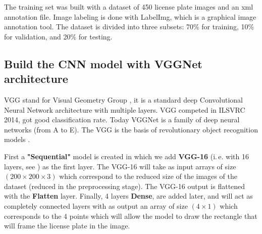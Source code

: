 \documentclass[lnbip]{svmultln}
\newcommand{\myfloatalign}{\centering}
\newcommand{\ie}{i.\,e. }
\begin{document}
	The training set was built with a dataset of 450 license plate images and an xml annotation file. Image labeling is done with LabelImg, which is a graphical image annotation tool. The dataset is divided into three subsets: 70\% for training, 10\% for validation, and 20\% for testing.
	


\subsection{Build the CNN model with VGGNet architecture}

	
	VGG stand for Visual Geometry Group \cite[][chap. 10]{antoine2018apprentissage}, it is a standard deep Convolutional Neural Network architecture with multiple layers. VGG competed in ILSVRC 2014, got good classification rate. Today VGGNet is a family of deep neural networks (from A to E). The VGG is the basis of revolutionary object recognition models \cite[]{tammina2019transfer}.  
	
 	First a \textbf{"Sequential"} model is created in which we add \textbf{VGG-16} (\ie with 16 layers, see \cite[]{antoine2018apprentissage, geron2017hands}) as the first layer. The VGG-16 will take as input arrays of size $(200 \times 200 \times 3)$ which correspond to the reduced size of the images of the dataset (reduced in the preprocessing stage).
 	The VGG-16 output is flattened with the \textbf{Flatten} layer. Finally, 4 layers \textbf{Dense}, are added later, and will act as completely connected layers with as output an array of size $(4 \times 1)$ which corresponds to the 4 points which will allow the model to draw the rectangle that will frame the license plate in the image.
 	
\end{document}
